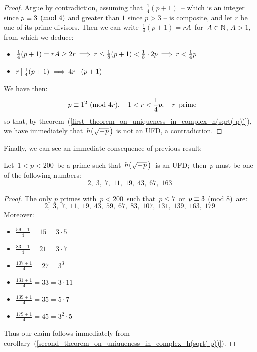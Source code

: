 \begin{proof}
%
Argue by contradiction, assuming that\, $\frac{1}{4}(p + 1)$
\,-- which is an integer since \mbox{$p \equiv 3 \pmod 4$}
and greater than $1$ since $p > 3$ -- is composite, and let $r$
be one of its prime divisors.
Then we can write\, $\frac{1}{4}(p + 1) = rA$\, for\,
$A \in \mathbb{N}$, $A > 1$, from which we deduce:

\begin{itemize}

\item 
$\frac{1}{4}(p + 1) = rA \geq 2r \:\Longrightarrow\:
r \leq \frac{1}{8}(p + 1) < \frac{1}{8} \cdot 2p
\:\Longrightarrow\: r < \frac{1}{4}p$

\item
$r \left|\, \frac{1}{4}(p + 1)\right.
\:\Longrightarrow\: 4r \mid (p + 1)$

\end{itemize}

We have then:
$$
-p \congruent 1^2\ (\mathrm{mod}\ 4r), \quad
1 < r < \frac{1}{4}p, \quad
r\,\ \textrm{prime}
$$
so that, by
theorem~(\ref{first_theorem_on_uniqueness_in_complex_h(sqrt(-p))}),
we have immediately that\, $\hhm{p}$ is not an UFD, a contradiction.
%
\end{proof}

Finally, we can see an immediate consequence of previous
result:

\begin{cor}\label{corollary_on_uniqueness_in_complex_h(sqrt(-p))}
Let\, $1 < p < 200$\, be a prime such that\, $\hhm{p}$\, is an
UFD;\, then\, $p$ must be one of the following numbers:
$$ 2,\;3,\;7,\;11,\;19,\;43,\;67,\;163 $$
\end{cor}

\begin{proof}
%
The only $p$ primes with\, $p < 200$\, such that\,
$p \leq 7$ \,or\, $p \equiv 3$ (mod 8)\, are:
$$
2,\; 3,\; 7,\; 11,\; 19,\; 43,\; 59,\; 67,\;
83,\; 107,\; 131,\; 139,\; 163,\; 179
$$
Moreover:
\begin{itemize}

\item $\frac{59 + 1}{4} = 15 = 3 \cdot 5$

\item $\frac{83 + 1}{4} = 21 = 3 \cdot 7$

\item $\frac{107 + 1}{4} = 27 = 3^3$

\item $\frac{131 + 1}{4} = 33 = 3 \cdot 11$

\item $\frac{139 + 1}{4} = 35 = 5 \cdot 7$

\item $\frac{179 + 1}{4} = 45 = 3^2 \cdot 5$

\end{itemize}

Thus our claim follows immediately from
corollary~(\ref{second_theorem_on_uniqueness_in_complex_h(sqrt(-p))}).
%
\end{proof}

